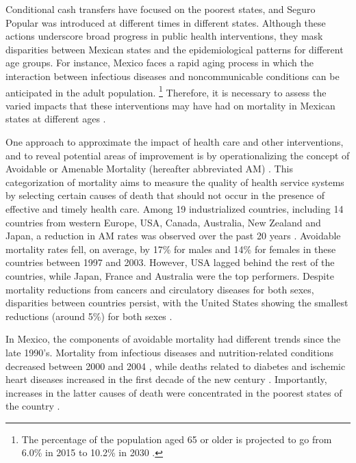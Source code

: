 \documentclass{bmcart}
\begin{document}
Conditional cash transfers have focused on the poorest states, and Seguro Popular was introduced at different times in different states. Although these actions underscore broad progress in public health interventions, they mask disparities between Mexican states and the epidemiological patterns for different age groups. For instance, Mexico faces a rapid aging process in which the interaction between infectious diseases and noncommunicable conditions can be anticipated in the adult population. \cite{Bygbjerg1499}\footnote{The percentage of the population aged 65 or older is projected to go from 6.0\% in 2015 to 10.2\% in 2030 \cite{CONAPO}.}  Therefore, it is necessary to assess the varied impacts that these interventions may have had on mortality in Mexican states at different ages \cite{urquieta2015evolution}. 

 
 One approach to approximate the impact of health care and other interventions, and to reveal potential areas of improvement is by operationalizing the
 concept of Avoidable or Amenable Mortality (hereafter abbreviated AM)
 \cite{nolte&mckee2004, nolte&mckee2008,elo2014}. This categorization of mortality aims to measure the quality of health service systems by selecting certain
 causes of death that should not occur in the presence of effective and
 timely health care. Among 19 industrialized countries, including 14 countries from western Europe, USA, Canada, Australia, New Zealand and Japan, a reduction in AM rates was
 observed over the past 20 years
 \cite{nolte&mckee2008}. Avoidable mortality rates fell, on average, by 17\%
 for males and 14\% for females in these countries between 1997 and 2003. However, USA lagged behind the rest of the countries, while Japan, France and Australia were the top performers. Despite mortality reductions from cancers and circulatory diseases for
 both sexes, disparities between countries persist, with the United
 States showing the smallest reductions (around 5\%) for both sexes  \cite{nolte&mckee2008}. 
 
 In Mexico, the components of avoidable mortality had different trends since the
late 1990's. Mortality from infectious diseases and nutrition-related conditions decreased between 2000 and 2004 \cite{francomarina2006}, while deaths related to diabetes and ischemic heart diseases increased in the first decade of the new century \cite{davila2014mortalidad}. Importantly, increases in the latter causes
of death were concentrated in the poorest states of the country
\cite{davila2014mortalidad}. 
\end{document}
